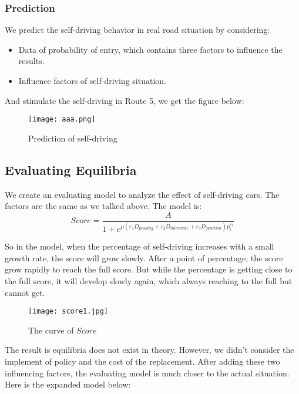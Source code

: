 \documentclass{mcmthesis}
\numberwithin{equation}{section}
\begin{document}
			\subsubsection{Prediction}
				We predict the self-driving behavior in real road situation by considering:
				\begin{itemize}
					\item Data of probability of entry, which contains three factors to influence the results.
					\item Influence factors of self-driving situation.
				\end{itemize}
				And stimulate the self-driving in Route 5, we get the figure below:
				\begin{figure}[H]
					\begin{center}
						\texttt{[image: aaa.png]}
						\caption{Prediction of self-driving}
					\end{center}
				\end{figure}


		\subsection{Evaluating Equilibria}
			We create an evaluating model to analyze the effect of self-driving cars. The factors are the same as we talked above. The model is:
			\begin{equation}
				Score = \frac{A}{1 + e^{\mu(\varepsilon_{1} D_{peaking} + \varepsilon_{2} D_{interstate} + \varepsilon_{3} D_{junction}) p_{i}^{\varepsilon_{4}}}}
			\end{equation}

			So in the model, when the percentage of self-driving increases with a small growth rate, the score will grow slowly. After a point of percentage, the score grow rapidly to reach the full score. But while the percentage is getting close to the full score, it will develop slowly again, which always reaching to the full but cannot get.
			\begin{figure}[H]
				\begin{center}
					\texttt{[image: score1.jpg]}
					\caption{The curve of $Score$}
				\end{center}
			\end{figure}

			The result is equilibria does not exist in theory. However, we didn't consider the implement of policy and the cost of the replacement. After adding these two influencing factors, the evaluating model is much closer to the actual situation. Here is the expanded model below:
\end{document}
